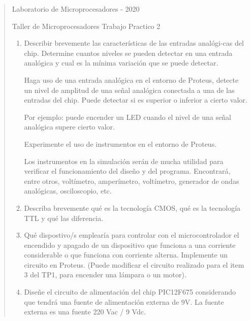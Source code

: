 \documentclass[a4paper]{article}
\begin{document}
\begin{quotation}

    \begin{center}

        Laboratorio de Microprocesadores - 2020
        
        Taller de Microprocesadores Trabajo Practico  2                

    \end{center}

    \begin{enumerate}

        \item{
            Describir brevemente las características de las entradas 
            analógi-cas del chip. Determine cuantos niveles se pueden 
            detectar en una entrada analógica y cual es la mínima 
            variación que se puede detectar.
            
            Haga uso de una entrada analógica en el entorno de Proteus,
            detecte un nivel de amplitud de una señal analógica 
            conectada a una de las entradas del chip. Puede detectar 
            si es superior o inferior a cierto valor.
            
            Por ejemplo: puede encender un LED cuando el nivel de una 
            señal analógica supere cierto valor.

            Experimente el uso de instrumentos en el entorno de Proteus.

            Los instrumentos en la simulación serán de mucha utilidad 
            para verificar el funcionamiento del diseño y del programa. 
            Encontrará, entre otros, voltímetro, amperímetro, 
            voltímetro, generador de ondas analógicas, osciloscopio, 
            etc.
        }
        \item{
            Describa brevemente qué es la tecnología CMOS, qué es la 
            tecnología TTL y qué las diferencia.
        }
        \item{
            Qué dispostivo/s emplearía para controlar con el 
            microcontrolador el encendido y apagado de un dispositivo 
            que funciona a una corriente considerable o que funciona 
            con corriente alterna. Implemente un circuito en Proteus. 
            (Puede modificar el circuito realizado para el item 3 del 
            TP1, para encender una lámpara o un motor).
        }
        \item{
            Diseñe el circuito de alimentación del chip PIC12F675 
            considerando que tendrá una fuente de alimentación externa 
            de 9V. La fuente externa es una fuente 220 Vac / 9 Vdc.
        } 
    \end{enumerate}
\end{quotation}
\end{document}

